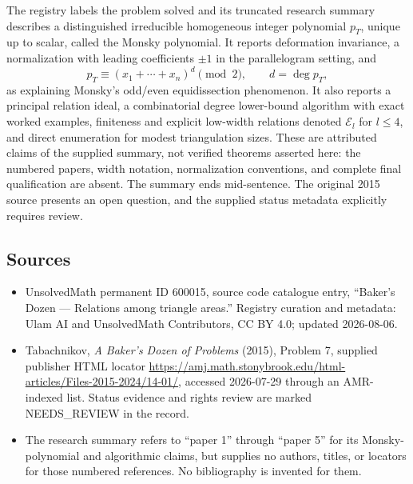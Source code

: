 \documentclass[11pt]{article}
\begin{document}
The registry labels the problem solved and its truncated research summary describes a distinguished irreducible homogeneous integer polynomial $p_T$, unique up to scalar, called the Monsky polynomial. It reports deformation invariance, a normalization with leading coefficients $\pm1$ in the parallelogram setting, and
\[
 p_T\equiv(x_1+\cdots+x_n)^d\pmod2,\qquad d=\deg p_T,
\]
as explaining Monsky's odd/even equidissection phenomenon. It also reports a principal relation ideal, a combinatorial degree lower-bound algorithm with exact worked examples, finiteness and explicit low-width relations denoted $\mathcal E_l$ for $l\leq4$, and direct enumeration for modest triangulation sizes. These are attributed claims of the supplied summary, not verified theorems asserted here: the numbered papers, width notation, normalization conventions, and complete final qualification are absent. The summary ends mid-sentence. The original 2015 source presents an open question, and the supplied status metadata explicitly requires review.
\subsection{Sources}
\begin{itemize}
\item UnsolvedMath permanent ID 600015, source code catalogue entry, ``Baker's Dozen --- Relations among triangle areas.'' Registry curation and metadata: Ulam AI and UnsolvedMath Contributors, CC BY 4.0; updated 2026-08-06.
\item Tabachnikov, \emph{A Baker's Dozen of Problems} (2015), Problem 7, supplied publisher HTML locator \url{https://amj.math.stonybrook.edu/html-articles/Files-2015-2024/14-01/}, accessed 2026-07-29 through an AMR-indexed list. Status evidence and rights review are marked NEEDS\_REVIEW in the record.
\item The research summary refers to ``paper 1'' through ``paper 5'' for its Monsky-polynomial and algorithmic claims, but supplies no authors, titles, or locators for those numbered references. No bibliography is invented for them.
\end{itemize}
\end{document}
